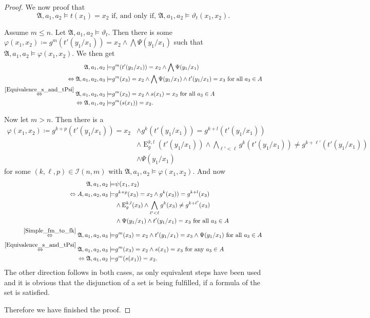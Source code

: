 \documentclass[a4paper,11pt,DIV=15]{scrartcl} %
\renewcommand{\phi}{\varphi}
\theoremstyle{plain}
\theoremstyle{definition}
\renewcommand{\theta}{\vartheta}
\begin{document}
\begin{proof}
	We now proof that 
	$$\mathfrak A, a_1,a_2\models t(x_1)=x_2 \text{ if, and only if, } \mathfrak A,a_1,a_2\models \theta_{t}(x_1,x_2).$$
	
	Assume $m\leq n$.
	Let $\mathfrak A, a_1,a_2 \models \theta_{t}$.
	Then there is some $\phi(x_1,x_2)\coloneqq g^{m}(t'(y_1/x_1))=x_2 \land \bigwedge \Psi(y_1/x_1)$ such that $\mathfrak A,a_1,a_2\models \phi(x_1,x_2)$.
	We then get
	\begin{align*}
		\mathfrak A,a_1,a_2 \models & g^{m}(t'(y_1/x_1))=x_2 \land \bigwedge \Psi(y_1/x_1) \\
		\Leftrightarrow \mathfrak A,a_1,a_2,a_3 \models & g^{m}(x_3)=x_2 \land \bigwedge \Psi(y_1/x_1) \land t'(y_1/x_1)=x_3 \text{ for all } a_3\in A \\
		\overset{\cref{Equivalence_s_and_tPsi}}{\Leftrightarrow} \mathfrak A,a_1,a_2,a_3\models & g^{m}(x_3)=x_2 \land s(x_1)=x_3 \text{ for all } a_3\in A \\
		\Leftrightarrow \mathfrak A,a_1,a_2 \models & g^{m}(s(x_1))=x_2.
	\end{align*}
	
	Now let $m>n$.
	Then there is a
	\begin{align*}
		\phi(x_1,x_2)\coloneqq g^{k+p}(t'(y_1/x_1))=x_2 &\land g^{k}(t'(y_1/x_1))=g^{k+l}(t'(y_1/x_1)) \\
		& \land \operatorname{E}^{k,l}_g(t'(y_1/x_1)) \land \bigwedge_{\ell'<\ell} g^{k}(t'(y_1/x_1))\neq g^{k+\ell'}(t'(y_1/x_1)) \\
		& \land \Psi(y_1/x_1)
	\end{align*}
	for some $(k,\ell,p)\in\mathcal I(n,m)$ with $\mathfrak A,a_1,a_2\models \phi(x_1,x_2)$.
	And now
	\begin{align*}
		\mathfrak A,a_1,a_2 \models & \psi(x_1,x_2) \\
		\Leftrightarrow A,a_1,a_2,a_3 \models &g^{k+p}(x_3)=x_2 \land g^{k}(x_3))=g^{k+l}(x_3) \\
			& \land \operatorname{E}^{k,l}_g(x_3) \land \bigwedge_{\ell'<\ell} g^{k}(x_3)\neq g^{k+\ell'}(x_3) \\
			& \land \Psi(y_1/x_1) \land t'(y_1/x_1)=x_3 \text{ for all } a_3\in A \\
		\overset{\cref{Simple_fm_to_fk}}{\Leftrightarrow} \mathfrak A, a_1,a_2,a_3 \models & g^{m}(x_3)=x_2 \land t'(y_1/x_1)=x_3 \land \Psi(y_1/x_1) \text{ for all } a_3 \in A \\
		\overset{\cref{Equivalence_s_and_tPsi}}{\Leftrightarrow} \mathfrak A,a_1,a_2,a_3 \models & g^{m}(x_3)=x_2\land s(x_1)=x_3 \text{ for any } a_3\in A \\
		\Leftrightarrow \mathfrak A,a_1,a_2 \models & g^{m}(s(x_1))=x_2.
	\end{align*}
	The other direction follows in both cases, as only equivalent steps have been used and it is obvious that the disjunction of a set is being fulfilled, if a formula of the set is satisfied.
	
	Therefore we have finished the proof.
\end{proof}
\end{document}
